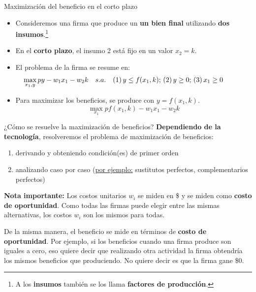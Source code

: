 \documentclass{beamer}
\theoremstyle{definition}
\begin{document}
\begin{frame}{Maximización del beneficio en el corto plazo}
\begin{itemize}
	\item Consideremos una firma que produce un \textbf{un bien final} utilizando \textbf{dos insumos}.\footnote{A los \textbf{insumos} también se los llama \textbf{factores de producción}.}
	\item En el \textbf{corto plazo}, el insumo 2 est\'a fijo en un valor $x_{2}=k$.
	\item El problema de la firma se resume en:
	\begin{equation*}\hspace{-3em}
	\max_{x_{1},y}py-w_{1}x_{1}-w_{2}k\quad s.a. \quad (1)\, y\leq f(x_{1},k) ; \, (2) \,y\geq 0;\, (3) \,x_{1}\geq 0 
	\end{equation*}
	\item Para maximizar los beneficios, se produce con $y=f(x_1,k)$.
	\begin{equation*}
	\max_{x_{1}}pf(x_{1},k)-w_{1}x_{1}-w_{2}k
	\end{equation*}

 
	\end{itemize}
\end{frame}

\begin{frame}{¿Cómo se resuelve la maximización de beneficios?}
    \textbf{Dependiendo de la tecnología}, resolveremos el problema de maximización de beneficios:
	\begin{enumerate}
	    \item derivando y obteniendo condición(es) de primer orden
	    \item analizando caso por caso (\underline{por ejemplo:} sustitutos perfectos, complementarios perfectos)
	\end{enumerate}

\medskip

\textbf{Nota importante:} Los costos unitarios $w_i$ se miden en \$ y se miden como \textbf{costo de oportunidad}. Como todas las firmas puede elegir entre las mismas alternativas, los costos $w_i$ son los mismos para todas.

\medskip

De la misma manera, el beneficio se mide en términos de \textbf{costo de oportunidad}. Por ejemplo, si los beneficios cuando una firma produce son iguales a cero, eso quiere decir que realizando otra actividad la firma obtendría los mismos beneficios que produciendo. No quiere decir es que la firma gane \$0.

\end{frame}
\end{document}

